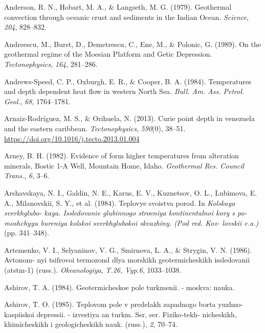 \begin{CSLReferences}{1}{1}
\leavevmode{}%
Anderson, R. N., Hobart, M. A., \& Langseth, M. G. (1979). Geothermal convection through oceanic crust and sediments in the {Indian Ocean}. \emph{Science}, \emph{204}, 828--832.

\leavevmode{}%
Andreescu, M., Burst, D., Demetrescu, C., Ene, M., \& Polonic, G. (1989). On the geothermal regime of the {Moesian Platform and Getic Depression}. \emph{Tectonophysics}, \emph{164}, 281--286.

\leavevmode{}%
Andrews-Speed, C. P., Oxburgh, E. R., \& Cooper, B. A. (1984). Temperatures and depth dependent heat flow in western {North Sea}. \emph{Bull. Am. Ass. Petrol. Geol.}, \emph{68}, 1764--1781.

\leavevmode{}%
Arnaiz-Rodríguez, M. S., \& Orihuela, N. (2013). Curie point depth in venezuela and the eastern caribbean. \emph{Tectonophysics}, \emph{590}(0), 38--51. \url{https://doi.org/10.1016/j.tecto.2013.01.004}

\leavevmode{}%
Arney, B. H. (1982). Evidence of form higher temperatures from alteration minerals, {Bostic 1-A Well, Mountain Home, Idaho}. \emph{Geothermal Res. Council Trans.}, \emph{6}, 3--6.

\leavevmode{}%
Arshavskaya, N. I., Galdin, N. E., Karus, E. V., Kuznetsov, O. L., Lubimova, E. A., Milanovskii, S. Y., et al. (1984). Teplovye svoistva porod. In \emph{Kolskaya sverkhglubo- kaya. Issledovanie glubinnogo stroeniya kontinentalnoi kory s po- moshchyyu bureniya kolskoi sverkhglubokoi skvazhiny. (Pod red. Koz- lovskii e.a.)} (pp. 341--348).

\leavevmode{}%
Artemenko, V. I., Selyaninov, V. G., Smirnova, L. A., \& Strygin, V. N. (1986). Avtonom- nyi tsifrovoi termozond dlya morskikh geotermicheskikh issledovanii (atstm-1) (russ.). \emph{Okeanologiya}, \emph{T.26, Vyp.6}, 1033--1038.

\leavevmode{}%
Ashirov, T. A. (1984). Geotermicheskoe pole turkmenii. - moskva: nauka.

\leavevmode{}%
Ashirov, T. O. (1985). Teplovom pole v predelakh zapadnogo borta yuzhno- kaspiiskoi depressii. - izvestiya an turkm. Ssr, ser. Fiziko-tekh- nicheskikh, khimicheskikh i geologicheskikh nauk. (russ.), \emph{2}, 70--74.


\end{CSLReferences}
